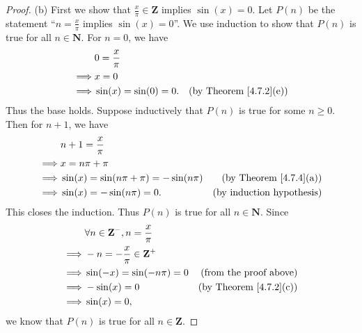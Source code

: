 \begin{proof}{(b)}
    First we show that \(\frac{x}{\pi} \in \mathbf{Z}\) implies \(\sin(x) = 0\).
    Let \(P(n)\) be the statement ``\(n = \frac{x}{\pi}\) implies \(\sin(x) = 0\)''.
    We use induction to show that \(P(n)\) is true for all \(n \in \mathbf{N}\).
    For \(n = 0\), we have
    \begin{align*}
                 & 0 = \frac{x}{\pi}                                           \\
        \implies & x = 0                                                       \\
        \implies & \sin(x) = \sin(0) = 0. & \text{(by Theorem \ref{4.7.2}(e))}
    \end{align*}
    Thus the base holds.
    Suppose inductively that \(P(n)\) is true for some \(n \geq 0\).
    Then for \(n + 1\), we have
    \begin{align*}
                 & n + 1 = \frac{x}{\pi}                                                           \\
        \implies & x = n \pi + \pi                                                                 \\
        \implies & \sin(x) = \sin(n \pi + \pi) = -\sin(n \pi) & \text{(by Theorem \ref{4.7.4}(a))} \\
        \implies & \sin(x) = -\sin(n \pi) = 0.                & \text{(by induction hypothesis)}
    \end{align*}
    This closes the induction.
    Thus \(P(n)\) is true for all \(n \in \mathbf{N}\).
    Since
    \begin{align*}
                 & \forall n \in \mathbf{Z}^-, n = \frac{x}{\pi}                                      \\
        \implies & -n = -\frac{x}{\pi} \in \mathbf{Z}^+                                               \\
        \implies & \sin(-x) = \sin(- n \pi) = 0                  & \text{(from the proof above)}      \\
        \implies & -\sin(x) = 0                                  & \text{(by Theorem \ref{4.7.2}(c))} \\
        \implies & \sin(x) = 0,
    \end{align*}
    we know that \(P(n)\) is true for all \(n \in \mathbf{Z}\).


\end{proof}
